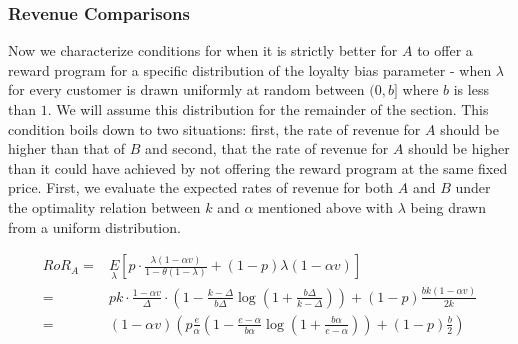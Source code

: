 \subsubsection{Revenue Comparisons}

Now we characterize conditions for when it is strictly better for $A$ to offer a reward program for a specific distribution of the loyalty bias parameter - when $\lambda$ for every customer is drawn uniformly at random between $(0,b]$ where $b$ is less than $1$. We will assume this distribution for the remainder of the section.
This condition boils down to two situations: first, the rate of revenue for $A$ should be higher than that of $B$ and second, that the rate of revenue for $A$ should be higher than it could have achieved by not offering the reward program at the same fixed price.
First, we evaluate the expected rates of revenue for both $A$ and $B$ under the optimality relation between $k$ and $\alpha$ mentioned above with $\lambda$ being drawn from a uniform distribution.

\begin{align*}
RoR_A =& \underset{\lambda}E\left[p\cdot\frac{\lambda(1-\alpha v)}{1-\theta(1-\lambda)} + (1-p)\lambda (1-\alpha v)\right]\\
      =& pk\cdot\frac{1-\alpha v}{\Delta}\cdot\left(1 - \frac{k-\Delta}{b\Delta}\log\left(1+\frac{b\Delta}{k-\Delta}\right)\right) + (1-p)\frac{bk(1-\alpha v)}{2k}\\
      =& (1-\alpha v) \left(p\frac{e}{\alpha}\left(1-\frac{e-\alpha}{b\alpha}\log\left(1+\frac{b\alpha}{e-\alpha}\right)\right) + (1-p)\frac{b}{2}\right)
\end{align*}

